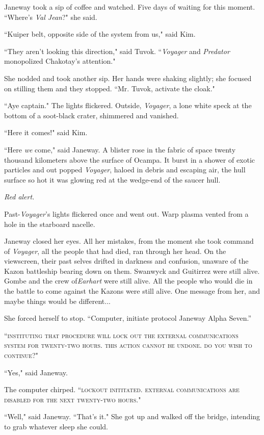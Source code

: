 \documentclass[twoside,letterpaper,12pt]{memoir}
\begin{document}
Janeway took a sip of coffee and watched. Five days of waiting for this moment. ``Where's \textit{Val Jean}?" she said. 

``Kuiper belt, opposite side of the system from us," said Kim. 

``They aren't looking this direction," said Tuvok. ``\textit{Voyager }and \textit{Predator} monopolized Chakotay's attention." 

She nodded and took another sip. Her hands were shaking slightly; she focused on stilling them and they stopped. ``Mr. Tuvok, activate the cloak." 

``Aye captain." The lights flickered. Outside, \textit{Voyager}, a lone white speck at the bottom of a soot-black crater, shimmered and vanished. 

``Here it comes!" said Kim. 

``Here \textit{we} come," said Janeway. A blister rose in the fabric of space twenty thousand kilometers above the surface of Ocampa. It burst in a shower of exotic particles and out popped \textit{Voyager}, haloed in debris and escaping air, the hull surface so hot it was glowing red at the wedge-end of the saucer hull. 

\textit{Red alert.} 

Past-\textit{Voyager}'s lights flickered once and went out. Warp plasma vented from a hole in the starboard nacelle. 

Janeway closed her eyes. All her mistakes, from the moment she took command of \textit{Voyager}, all the people that had died, ran through her head. On the viewscreen, their past selves drifted in darkness and confusion, unaware of the Kazon battleship bearing down on them. Swanwyck and Guitirrez were still alive. Gombe and the crew of\textit{Earhart }were still alive. All the people who would die in the battle to come against the Kazons were still alive. One message from her, and maybe things would be different...

She forced herself to stop. ``Computer, initiate protocol Janeway Alpha Seven.” 

``\textsc{instituting that procedure will lock out the external communications system for twenty-two hours. this action cannot be undone. do you wish to continue?}" 

``Yes," said Janeway. 

The computer chirped. ``\textsc{lockout inititated. external communications are disabled for the next twenty-two hours}." 

``Well," said Janeway. ``That's it." She got up and walked off the bridge, intending to grab whatever sleep she could. 
\end{document}
